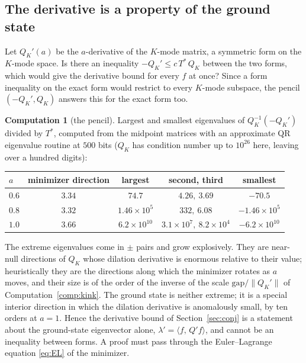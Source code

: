 \documentclass[11pt]{article}
\theoremstyle{definition}
\newtheorem{computation}[theorem]{Computation}
\theoremstyle{remark}
\newcommand{\ip}[2]{\langle #1,\, #2\rangle}
\newcommand{\Tst}{T^{*}}
\begin{document}
\subsection{The derivative is a property of the ground state}\label{sec:pencil}

Let $Q_K'(a)$ be the $a$-derivative of the $K$-mode matrix, a symmetric form on the $K$-mode space. Is there an inequality $-Q_K'\le c\,\Tst\,Q_K$ between the two forms, which would give the derivative bound for every $f$ at once? Since a form inequality on the exact form would restrict to every $K$-mode subspace, the pencil $(-Q_K',Q_K)$ answers this for the exact form too.

\begin{computation}[the pencil]\label{comp:pencil}
Largest and smallest eigenvalues of $Q_K^{-1}(-Q_K')$ divided by $\Tst$, computed from the midpoint matrices with an approximate QR eigenvalue routine at $500$ bits ($Q_K$ has condition number up to $10^{26}$ here, leaving over a hundred digits):
\begin{center}
\begin{tabular}{@{}lcccc@{}}
\toprule
$a$ & minimizer direction & largest & second, third & smallest\\
\midrule
$0.6$ & $3.34$ & $74.7$ & $4.26,\ 3.69$ & $-70.5$\\
$0.8$ & $3.32$ & $1.46\times10^{5}$ & $332,\ 6.08$ & $-1.46\times10^{5}$\\
$1.0$ & $3.66$ & $6.2\times10^{10}$ & $3.1\times10^7,\ 8.2\times10^4$ & $-6.2\times10^{10}$\\
\bottomrule
\end{tabular}
\end{center}
\end{computation}

The extreme eigenvalues come in $\pm$ pairs and grow explosively. They are near-null directions of $Q_K$ whose dilation derivative is enormous relative to their value; heuristically they are the directions along which the minimizer rotates as $a$ moves, and their size is of the order of the inverse of the scale $\text{gap}/\|Q_K'\|$ of Computation~\ref{comp:kink}. The ground state is neither extreme; it is a special interior direction in which the dilation derivative is anomalously small, by ten orders at $a=1$. Hence the derivative bound of Section~\ref{sec:conj} is a statement about the ground-state eigenvector alone, $\lambda'=\ip{f}{Q'f}$, and cannot be an inequality between forms. A proof must pass through the Euler--Lagrange equation \eqref{eq:EL} of the minimizer.
\end{document}
